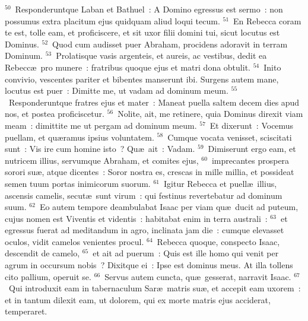 ${}^{50}$~Responderuntque Laban et Bathuel~: A Domino egressus est sermo~: non possumus extra placitum ejus quidquam aliud loqui tecum.
${}^{51}$~En Rebecca coram te est, tolle eam, et proficiscere, et sit uxor filii domini tui, sicut locutus est Dominus.
${}^{52}$~Quod cum audisset puer Abraham, procidens adoravit in terram Dominum.
${}^{53}$~Prolatisque vasis argenteis, et aureis, ac vestibus, dedit ea Rebecc\ae\ pro munere~: fratribus quoque ejus et matri dona obtulit.
${}^{54}$~Inito convivio, vescentes pariter et bibentes manserunt ibi. Surgens autem mane, locutus est puer~: Dimitte me, ut vadam ad dominum meum.
${}^{55}$~Responderuntque fratres ejus et mater~: Maneat puella saltem decem dies apud nos, et postea proficiscetur.
${}^{56}$~Nolite, ait, me retinere, quia Dominus direxit viam meam~: dimittite me ut pergam ad dominum meum.
${}^{57}$~Et dixerunt~: Vocemus puellam, et qu\ae ramus ipsius voluntatem.
${}^{58}$~Cumque vocata venisset, sciscitati sunt~: Vis ire cum homine isto~? Qu\ae\ ait~: Vadam.
${}^{59}$~Dimiserunt ergo eam, et nutricem illius, servumque Abraham, et comites ejus,
${}^{60}$~imprecantes prospera sorori su\ae , atque dicentes~: Soror nostra es, crescas in mille millia, et possideat semen tuum portas inimicorum suorum.
${}^{61}$~Igitur Rebecca et puell\ae\ illius, ascensis camelis, secut\ae\ sunt virum~: qui festinus revertebatur ad dominum suum.
${}^{62}$~Eo autem tempore deambulabat Isaac per viam qu\ae\ ducit ad puteum, cujus nomen est Viventis et videntis~: habitabat enim in terra australi~:
${}^{63}$~et egressus fuerat ad meditandum in agro, inclinata jam die~: cumque elevasset oculos, vidit camelos venientes procul.
${}^{64}$~Rebecca quoque, conspecto Isaac, descendit de camelo,
${}^{65}$~et ait ad puerum~: Quis est ille homo qui venit per agrum in occursum nobis~? Dixitque ei~: Ipse est dominus meus. At illa tollens cito pallium, operuit se.
${}^{66}$~Servus autem cuncta, qu\ae\ gesserat, narravit Isaac.
${}^{67}$~Qui introduxit eam in tabernaculum Sar\ae\ matris su\ae , et accepit eam uxorem~: et in tantum dilexit eam, ut dolorem, qui ex morte matris ejus acciderat, temperaret.

